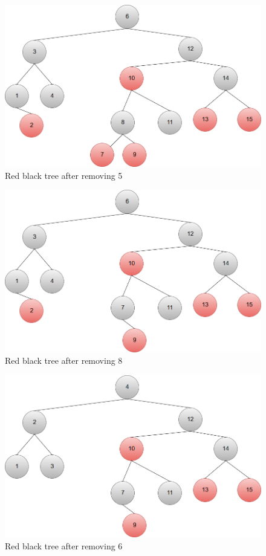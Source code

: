 \documentclass{article}
\begin{document}
\begin{enumerate}
    \begin{figure}[H]
 	  \centering
 	  \caption{Red black tree after removing 5}
 	  \label{Trees:RedBlackR1}
	  \includegraphics[width=\textwidth]{RedBlackR1}
    \end{figure}
    \begin{figure}[H]
 	  \centering
 	  \caption{Red black tree after removing 8}
 	  \label{Trees:RedBlackR2}
	  \includegraphics[width=\textwidth]{RedBlackR2}
    \end{figure}
    \begin{figure}[H]
 	  \centering
 	  \caption{Red black tree after removing 6}
 	  \label{Trees:RedBlackR3}
	  \includegraphics[width=\textwidth]{RedBlackR3}
    \end{figure}
    

\end{enumerate}
\end{document}
